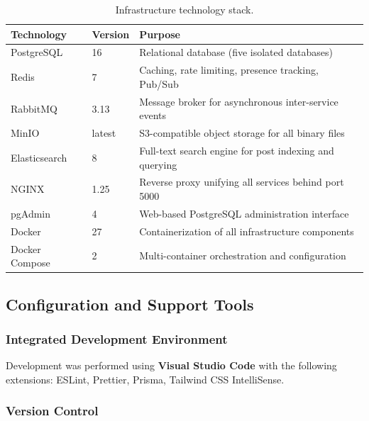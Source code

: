\begin{table}[H]
  \centering
  \caption{Infrastructure technology stack.}
  \label{tab:infra-stack}
  \small
  \begin{tabularx}{\textwidth}{@{} l l X @{}}
    \toprule
    \textbf{Technology} & \textbf{Version} & \textbf{Purpose} \\
    \midrule
    PostgreSQL      & 16       & Relational database (five isolated databases) \\
    Redis           & 7        & Caching, rate limiting, presence tracking, Pub/Sub \\
    RabbitMQ        & 3.13     & Message broker for asynchronous inter-service events \\
    MinIO           & latest   & S3-compatible object storage for all binary files \\
    Elasticsearch   & 8        & Full-text search engine for post indexing and querying \\
    NGINX           & 1.25     & Reverse proxy unifying all services behind port 5000 \\
    pgAdmin         & 4        & Web-based PostgreSQL administration interface \\
    Docker          & 27       & Containerization of all infrastructure components \\
    Docker Compose  & 2        & Multi-container orchestration and configuration \\
    \bottomrule
  \end{tabularx}
\end{table}

\subsection{Configuration and Support Tools}
\label{sec:tools}

\subsubsection{Integrated Development Environment}

Development was performed using \textbf{Visual Studio Code} with the following extensions: ESLint, Prettier, Prisma, Tailwind CSS IntelliSense.

\subsubsection{Version Control}

